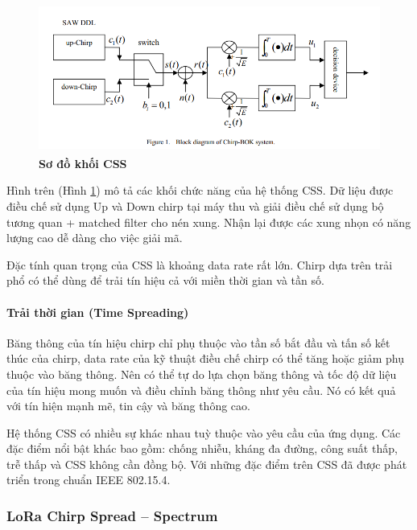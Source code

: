 \documentclass{article} %
\begin{document}
	\begin{figure}[!ht]
		\centering
		\includegraphics[width=12.5cm,height=4.9cm]{Images/sodokhoiCSS.png}
		\caption[Sơ đồ khối CSS \cite{wang2008performance}]{\bfseries \fontsize{12pt}{0pt}\selectfont Sơ đồ khối CSS \cite{wang2008performance}}
		\label{sodokhoiCSS}
	\end{figure}
	
	Hình trên (Hình \ref{sodokhoiCSS}) mô tả các khối chức năng của hệ thống CSS. Dữ liệu được điều chế sử dụng Up và Down chirp tại máy thu và giải điều chế sử dụng bộ tương quan + matched filter cho nén xung. Nhận lại được các xung nhọn có năng lượng cao dễ dàng cho việc giải mã.	
	
	Đặc tính quan trọng của CSS là khoảng data rate rất lớn. Chirp dựa trên trải phổ có thể dùng để trải tín hiệu cả với miền thời gian và tần số.

	\paragraph{Trải thời gian (Time Spreading)}\mbox{}
	
	Băng thông của tín hiệu chirp chỉ phụ thuộc vào tần số bắt đầu và tấn số kết thúc của chirp, data rate của kỹ thuật điều chế chirp có thể tăng hoặc giảm phụ thuộc vào băng thông. Nên có thể tự do lựa chọn băng thông và tốc độ dữ liệu của tín hiệu mong muốn và điều chỉnh băng thông như yêu cầu. Nó có kết quả với tín hiện mạnh mẽ, tin cậy và băng thông cao.
	
	Hệ thống CSS có nhiều sự khác nhau tuỳ thuộc vào yêu cầu của ứng dụng. Các đặc điểm nổi bật khác bao gồm: chống nhiễu, kháng đa đường, công suất thấp, trễ thấp và CSS không cần đồng bộ. Với những đặc điểm trên CSS đã được phát triển trong chuẩn IEEE 802.15.4.
	
	\subsubsection{LoRa Chirp Spread – Spectrum}
	
\end{document}

